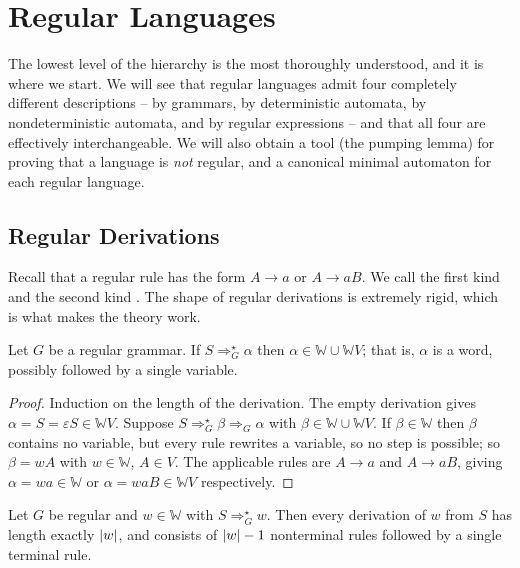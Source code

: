 \documentclass[a4paper]{scrartcl}
\newcommand{\WW}{\mathbb{W}}
\newcommand{\eps}{\varepsilon}
\begin{document}
\section{Regular Languages}\label{sec:regular}

The lowest level of the hierarchy is the most thoroughly understood, and it is where we start. We will see that regular languages admit four completely different descriptions -- by grammars, by deterministic automata, by nondeterministic automata, and by regular expressions -- and that all four are effectively interchangeable. We will also obtain a tool (the pumping lemma) for proving that a language is \emph{not} regular, and a canonical minimal automaton for each regular language.

\subsection{Regular Derivations}

Recall that a regular rule has the form $A \to a$ or $A \to aB$. We call the first kind  and the second kind . The shape of regular derivations is extremely rigid, which is what makes the theory work.

\begin{lemma}\label{lem:regularform}
	Let $G$ be a regular grammar. If $S \Rightarrow_G^\star \alpha$ then $\alpha \in \WW \cup \WW V$; that is, $\alpha$ is a word, possibly followed by a single variable.
\end{lemma}

\begin{proof}
	Induction on the length of the derivation. The empty derivation gives $\alpha = S = \eps S \in \WW V$. Suppose $S \Rightarrow_G^\star \beta \Rightarrow_G \alpha$ with $\beta \in \WW \cup \WW V$. If $\beta \in \WW$ then $\beta$ contains no variable, but every rule rewrites a variable, so no step is possible; so $\beta = wA$ with $w \in \WW$, $A \in V$. The applicable rules are $A \to a$ and $A \to aB$, giving $\alpha = wa \in \WW$ or $\alpha = waB \in \WW V$ respectively.
\end{proof}

\begin{lemma}\label{lem:regularlength}
	Let $G$ be regular and $w \in \WW$ with $S \Rightarrow_G^\star w$. Then every derivation of $w$ from $S$ has length exactly $\lvert w\rvert$, and consists of $\lvert w\rvert - 1$ nonterminal rules followed by a single terminal rule.
\end{lemma}
\end{document}
